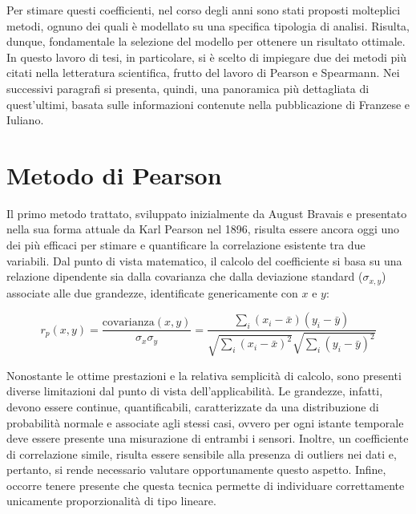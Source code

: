 Per stimare questi coefficienti, nel corso degli anni sono stati proposti molteplici metodi, ognuno dei quali è modellato su una specifica tipologia di analisi. Risulta, dunque, fondamentale la selezione del modello per ottenere un risultato ottimale. In questo lavoro di tesi, in particolare, si è scelto di impiegare due dei metodi più citati nella letteratura scientifica, frutto del lavoro di Pearson e Spearmann. Nei successivi paragrafi si presenta, quindi, una panoramica più dettagliata di quest'ultimi, basata sulle informazioni contenute nella pubblicazione di Franzese e Iuliano\cite{Statistical_Analysis}.

\section{Metodo di Pearson}

Il primo metodo trattato, sviluppato inizialmente da August Bravais e presentato nella sua forma attuale da Karl Pearson nel 1896, risulta essere ancora oggi uno dei più efficaci per stimare e quantificare la correlazione esistente tra due variabili. Dal punto di vista matematico, il calcolo del coefficiente si basa su una relazione dipendente sia dalla covarianza che dalla deviazione standard ($\sigma_{x,y}$) associate alle due grandezze, identificate genericamente con $x$ e $y$:

    \begin{equation}
        \displaystyle r_{p} (x, y) = \frac{\text{covarianza}(x, y)}{\sigma_{x} \sigma_{y}} = \frac{\sum_{i} (x_{i} - \bar{x})(y_{i} - \bar{y})}{\sqrt{\sum_{i}(x_{i} - \bar{x})^{2}} \sqrt{\sum_{i}(y_{i} - \bar{y})^{2}}}
        \label{eq:pearson}
    \end{equation}

Nonostante le ottime prestazioni e la relativa semplicità di calcolo, sono presenti diverse limitazioni dal punto di vista dell'applicabilità. Le grandezze, infatti, devono essere continue, quantificabili, caratterizzate da una distribuzione di probabilità normale e associate agli stessi casi, ovvero per ogni istante temporale deve essere presente una misurazione di entrambi i sensori. Inoltre, un coefficiente di correlazione simile, risulta essere sensibile alla presenza di outliers nei dati e, pertanto, si rende necessario valutare opportunamente questo aspetto. Infine, occorre tenere presente che questa tecnica permette di individuare correttamente unicamente proporzionalità di tipo lineare.


